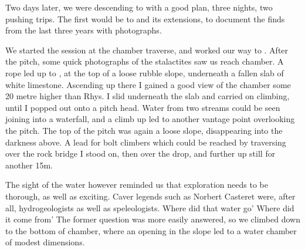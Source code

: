     Two days later, we were descending to  with a good plan, three nights, two pushing trips. The first would be to  and its extensions, to document the finds from the last three years with photographs. 

    We started the session at the  chamber traverse, and worked our way to . After the pitch, some quick photographs of the  stalactites saw us reach  chamber. A rope led up to , at the top of a loose rubble slope, underneath a fallen slab of white limestone. Ascending up there I gained a good view of the chamber some 20 metre higher than Rhys. I slid underneath the slab and carried on climbing, until I popped out onto a pitch head. Water from two streams could be seen joining into a waterfall, and a climb up led to another vantage point overlooking the pitch. The top of the pitch was again a loose slope, disappearing into the darkness above. A lead for bolt climbers which could be reached by traversing over the rock bridge I stood on, then over the drop, and further up still for another 15m. 

    The sight of the water however reminded us that exploration needs to be thorough, as well as exciting. Caver legends such as Norbert Casteret were, after all, hydrogeologists as well as speleologists. Where did that water go' Where did it come from' The former question was more easily answered, so we climbed down to the bottom of  chamber, where an opening in the slope led to a water chamber of modest dimensions.

